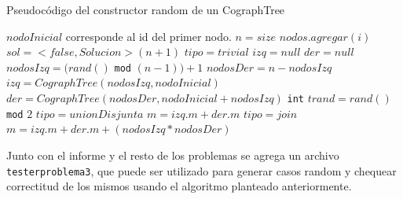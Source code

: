 \begin{algorithm}[H]
  \begin{algorithmic}[1]
  \caption{Pseudocódigo del constructor random de un CographTree}
  \label{algo:3-3}
	\State \Comment $nodoInicial$ corresponde al id del primer nodo.
	\State $n = size$
		\State $nodos.agregar(i)$ 
	\EndFor
	\State $sol = <false, Solucion>(n+1)$
		\State $tipo = trivial$
		\State $izq = null$
		\State $der = null$
	\Else
		\State $nodosIzq = (rand()$ \texttt{mod} $(n-1)) + 1 $
		\State $nodosDer = n - nodosIzq$
		\State $izq = CographTree(nodosIzq, nodoInicial)$
		\State $der = CographTree(nodosDer, nodoInicial + nodosIzq)$
		\State \texttt{int} $trand = rand()$ \texttt{mod} $2$
			\State $tipo = unionDisjunta$
			\State $m = izq.m + der.m$
		\Else
			\State $tipo = join$
			\State $m = izq.m + der.m + (nodosIzq * nodosDer)$
		\EndIf
	\EndIf		
  \EndProcedure
  \end{algorithmic}
\end{algorithm}

Junto con el informe y el resto de los problemas se agrega un archivo \texttt{testerproblema3}, que puede ser utilizado para generar casos random y chequear correctitud de los mismos usando el algoritmo planteado anteriormente.


